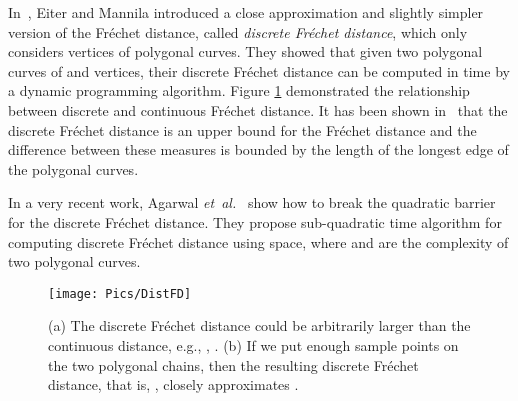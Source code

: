 \documentclass[12pt]{dalthesis}
\newcommand{\etal}{{\em et~al.\/}}
\newcommand{\REM}[1]{}
\newcommand{\Frechet}{Fr\'echet }
\begin{document}
In~\cite{DisceteFD}, Eiter and Mannila 
introduced a 
close approximation and slightly simpler version of the \Frechet distance, called {\em discrete 
\Frechet distance}, which
only considers vertices of polygonal curves.
They showed that given two polygonal curves of  and  vertices, their discrete 
\Frechet distance can be computed  in  time by a dynamic programming algorithm. 
Figure \ref{fig:DistFig} demonstrated the relationship between discrete 
and continuous \Frechet distance. 
It has been shown in~\cite{DisceteFD} that the discrete \Frechet distance is an 
upper bound for the \Frechet distance and the difference between these measures 
is bounded by the length of the longest edge of the polygonal 
curves. 
\REM{


Given a polygonal curve  of  vertices, let
a -walk along  be a partitioning of  into   disjoint non-empty
subsets . 
Assume two polygonal curves   and  with 
the sequence of endpoints of  and , respectively. 
A paired walk along  and  is a -walk  along  and a 
-walk  s.t. for 
either  or  ( i.e., either  or  contains exactly one vertex). 
Consider again the scenario in which the person walks along 
and the dog walks along . Then, the definition of paired walk 
is based on the three following cases: 
\begin{flushleft}
(1)   : the dog moves forward and the person stays.

(2)   : the person moves forward and the dog stays.

(3)   : both the person and the dog move forward.
\end{flushleft}


The cost of a paired walk  along 
two curves  and  is defined as 


Then, the discrete \Frechet distance between two polygonal curves 
 and  :

}



In a very recent work, 
Agarwal \etal~\cite{DiscreteSUBQuadractic} 
show how to break the quadratic barrier for the discrete \Frechet distance. 
They propose sub-quadratic 
 time
algorithm for computing discrete \Frechet distance 
using  space, 
where  and  are the complexity of 
two polygonal curves. 





\begin{figure}[t]
	\centering
	\texttt{[image: Pics/DistFD]}
	\caption{ (a) The discrete \Frechet distance could be arbitrarily larger than the continuous distance, e.g., , .  (b) If we
put enough sample points on the two polygonal chains, 
then the resulting discrete \Frechet
distance, that is, , closely approximates .
}
	\label{fig:DistFig}
\end{figure}
\end{document}
